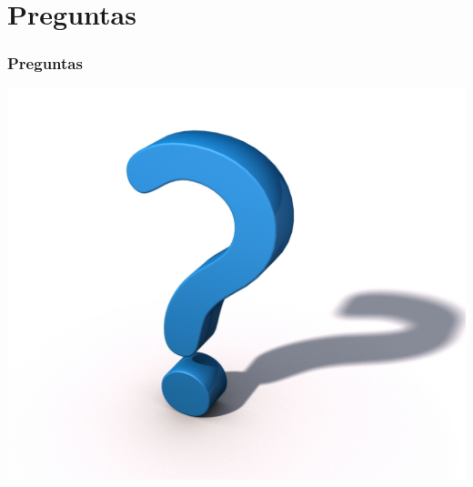\documentclass{beamer}
\begin{document}
	
\section{Preguntas}
	\begin{frame}
		\frametitle{Preguntas}
		\includegraphics[height = \textheight]{./img/preguntas.jpeg}
	\end{frame}
\end{document}
